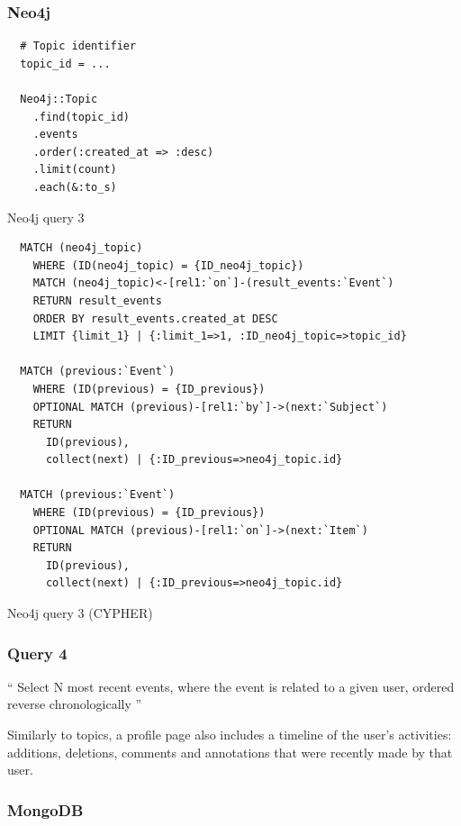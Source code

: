 \subsubsection*{Neo4j}

\begin{listing}[H]
  \begin{verbatim}
  # Topic identifier
  topic_id = ...

  Neo4j::Topic
    .find(topic_id)
    .events
    .order(:created_at => :desc)
    .limit(count)
    .each(&:to_s)
  \end{verbatim}


  \caption{Neo4j query 3}
  \label{lst:neo4j-query-3}
\end{listing}

\begin{listing}[H]
  \begin{verbatim}
  MATCH (neo4j_topic)
    WHERE (ID(neo4j_topic) = {ID_neo4j_topic})
    MATCH (neo4j_topic)<-[rel1:`on`]-(result_events:`Event`)
    RETURN result_events
    ORDER BY result_events.created_at DESC
    LIMIT {limit_1} | {:limit_1=>1, :ID_neo4j_topic=>topic_id}

  MATCH (previous:`Event`)
    WHERE (ID(previous) = {ID_previous})
    OPTIONAL MATCH (previous)-[rel1:`by`]->(next:`Subject`)
    RETURN
      ID(previous),
      collect(next) | {:ID_previous=>neo4j_topic.id}

  MATCH (previous:`Event`)
    WHERE (ID(previous) = {ID_previous})
    OPTIONAL MATCH (previous)-[rel1:`on`]->(next:`Item`)
    RETURN
      ID(previous),
      collect(next) | {:ID_previous=>neo4j_topic.id}
  \end{verbatim}

  \caption{Neo4j query 3 (CYPHER)}
  \label{lst:neo4j-query-3 (CYPHER)}
\end{listing}

\subsubsection{Query 4}
\label{subsubsec:query-4}

``
Select N most recent events, where the event is related to a given user, ordered reverse chronologically
''

Similarly to topics, a profile page also includes a timeline of the user's activities: additions, deletions, comments and annotations that were recently made by that user.

\subsubsection*{MongoDB}

